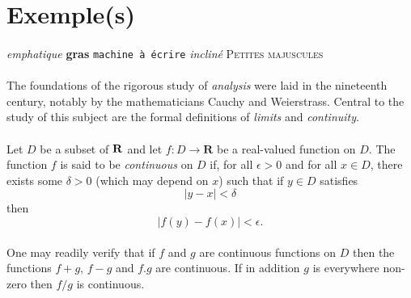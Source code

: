 
\appendix

    \section{Exemple(s)}

        \paragraph{}
            \emph{emphatique}
            \textbf{gras}
            \texttt{machine à écrire}
            \textsl{incliné}
            \textsc{Petites majuscules}

        \paragraph{}
            The foundations of the rigorous study of \emph{analysis}
            were laid in the nineteenth century, notably by the
            mathematicians Cauchy and Weierstrass. Central to the
            study of this subject are the formal definitions of
            \emph{limits} and \emph{continuity}.

        \paragraph{}
            Let $D$ be a subset of $\bf R$ and let
            $f \colon D \to \mathbf{R}$ be a real-valued function on
            $D$. The function $f$ is said to be \emph{continuous} on
            $D$ if, for all $\epsilon > 0$ and for all $x \in D$,
            there exists some $\delta > 0$ (which may depend on $x$)
            such that if $y \in D$ satisfies
            \[ |y - x| < \delta \]
            then
            \[ |f(y) - f(x)| < \epsilon. \]

        \paragraph{}
            One may readily verify that if $f$ and $g$ are continuous
            functions on $D$ then the functions $f+g$, $f-g$ and
            $f.g$ are continuous. If in addition $g$ is everywhere
            non-zero then $f/g$ is continuous.
